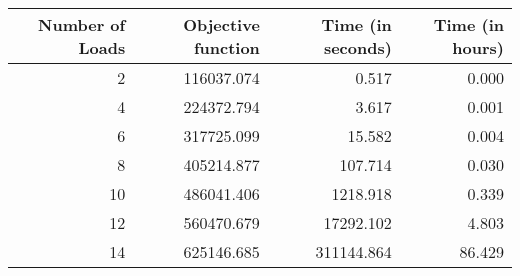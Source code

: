 \begin{tabular}{| r | r | r | r |}
  \hline 
  Number of Loads & Objective function & Time (in seconds) & Time (in hours) \\ 
  \hline \hline 
  2 & 116037.074 & 0.517 & 0.000 \\ \hline 
  4 & 224372.794 & 3.617 & 0.001 \\ \hline 
  6 & 317725.099 & 15.582 & 0.004 \\ \hline 
  8 & 405214.877 & 107.714 & 0.030 \\ \hline 
  10 & 486041.406 & 1218.918 & 0.339 \\ \hline 
  12 & 560470.679 & 17292.102 & 4.803 \\ \hline 
  14 & 625146.685 & 311144.864 & 86.429 \\ \hline 
\end{tabular}
